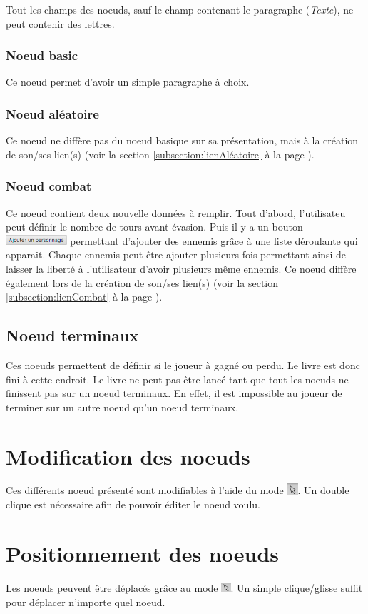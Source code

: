 			Tout les champs des noeuds, sauf le champ contenant le paragraphe (\textit{Texte}), ne peut contenir des lettres.

			\subsubsection{Noeud basic}
				Ce noeud permet d'avoir un simple paragraphe à choix.

			\subsubsection{Noeud aléatoire}
				Ce noeud ne diffère pas du noeud basique sur sa présentation, mais à la création de son/ses lien(s) (voir la section \ref{subsection:lienAléatoire} à la page \pageref{subsection:lienAléatoire}).

			\subsubsection{Noeud combat}
				Ce noeud contient deux nouvelle données à remplir. Tout d'abord, l'utilisateu peut définir le nombre de tours avant évasion. Puis il y a un bouton \includegraphics[height=10pt]{img/noeudAddPersonnage} permettant d'ajouter des ennemis grâce à une liste déroulante qui apparait. Chaque ennemis peut être ajouter plusieurs fois permettant ainsi de laisser la liberté à l'utilisateur d'avoir plusieurs même ennemis.
				Ce noeud diffère également lors de la création de son/ses lien(s) (voir la section \ref{subsection:lienCombat} à la page \pageref{subsection:lienCombat}).

		\subsection{Noeud terminaux}
			Ces noeuds permettent de définir si le joueur à gagné ou perdu. Le livre est donc fini à cette endroit. Le livre ne peut pas être lancé tant que tout les noeuds ne finissent pas sur un noeud terminaux. En effet, il est impossible au joueur de terminer sur un autre noeud qu'un noeud terminaux.

	\section{Modification des noeuds}
		Ces différents noeud présenté sont modifiables à l'aide du mode \includegraphics[height=0.4cm]{img/modeSelected.png}. Un double clique est nécessaire afin de pouvoir éditer le noeud voulu.

	\section{Positionnement des noeuds}
		Les noeuds peuvent être déplacés grâce au mode \includegraphics[height=10pt]{img/modeSelected.png}. Un simple clique/glisse suffit pour déplacer n'importe quel noeud.
